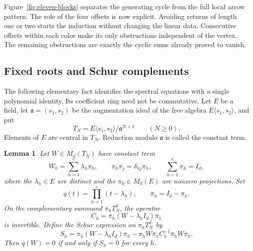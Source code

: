 \documentclass[11pt]{article}
\newtheorem{lemma}[theorem]{Lemma}
\theoremstyle{definition}
\theoremstyle{remark}
\numberwithin{equation}{section}
\begin{document}
Figure~\ref{fig:eleven-blocks} separates the generating cycle from the
full local arrow pattern. The role of the four offsets is now explicit.  Avoiding returns of length
one or two starts the induction without changing the linear data.
Consecutive offsets within each color make its only obstructions
independent of the vertex.  The remaining obstructions are exactly the
cyclic sums already proved to vanish.

\subsection{Fixed roots and Schur complements}

The following elementary fact identifies the spectral equations with a
single polynomial identity. Its coefficient ring need not be commutative.
Let $E$ be a field, let $\mathfrak a=(s_1,s_2)$ be the augmentation ideal
of the free algebra $E\langle s_1,s_2\rangle$, and put
\[
  T_N=E\langle s_1,s_2\rangle/\mathfrak a^{N+1}
  \qquad (N\geq 0).
\]
Elements of $E$ are central in $T_N$. Reduction modulo $\mathfrak a$
is called the constant term.

\begin{lemma}\label{lem:schur-polynomial}
Let $W\in M_d(T_N)$ have constant term
\[
  W_0=\sum_{h=1}^{e}\lambda_h\pi_h,
  \qquad
  \pi_h\pi_j=\delta_{hj}\pi_h,
  \qquad
  \sum_{h=1}^{e}\pi_h=I_d,
\]
where the $\lambda_h\in E$ are distinct and the $\pi_h\in M_d(E)$
are nonzero projections. Set
\[
  q(t)=\prod_{h=1}^{e}(t-\lambda_h),
  \qquad \bar\pi_h=I_d-\pi_h.
\]
On the complementary summand $\bar\pi_h T_N^d$, the operator
\[
  C_h=\bar\pi_h(W-\lambda_h I_d)\bar\pi_h
\]
is invertible. Define the Schur expression on $\pi_h T_N^d$ by
\[
  S_h=\pi_h(W-\lambda_h I_d)\pi_h
      -\pi_hW\bar\pi_h C_h^{-1}\bar\pi_hW\pi_h.
\]
Then $q(W)=0$ if and only if $S_h=0$ for every $h$.
\end{lemma}
\end{document}
